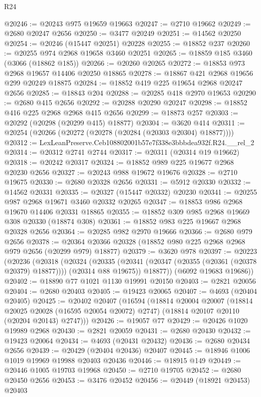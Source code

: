 \begin{lexlean}{R24}
\begin{coremodule}
@20246 := @20243 @975 @19659 @19663
@20247 := @2710 @19662
@20249 := @2680 @20247 @2656
@20250 := @3477 @20249
@20251 := @14562 @20250
@20254 := @20246 (@15447 @20251) @20228
@20255 := @18852 @237
@20260 := @20255 @974 @2968 @19658 @3460 @20251
@20265 := @18859 @185 @3460 (@3066 (@18862 @185))
@20266 := @20260 @20265
@20272 := @18853 @973 @2968 @19657 @14406 @20250 @18865
@20278 := @18867 @421 @2968 @19656 @299 @20249 @18875
@20284 := @18852 @419 @225 @19654 @2968 @20247 @2656
@20285 := @18843 @204
@20288 := @20285 @418 @2970 @19653
@20290 := @2680 @415 @2656
@20292 := @20288 @20290 @20247
@20298 := @18852 @416 @225 @2968 @2968 @415 @2656
@20299 := @18873 @257
@20303 := @20292 (@20298 (@20299 @415) @18877)
@20304 := @3620 @414
@20311 := @20254 (@20266 (@20272 (@20278 (@20284 (@20303 @20304) @18877))))
@20312 := LexLeanPreserve.Ceb108802001b57e7f338e3bbbdea932f.R24.__rel_2
@20314 := @20312 @2741 @2744
@20317 := @20311 (@20314 @19 @19662)
@20318 := @20242 @20317
@20324 := @18852 @989 @225 @19677 @2968 @20230 @2656
@20327 := @20243 @988 @19672 @19676
@20328 := @2710 @19675
@20330 := @2680 @20328 @2656
@20331 := @5912 @20330
@20332 := @14562 @20331
@20335 := @20327 (@15447 @20332) @20230
@20341 := @20255 @987 @2968 @19671 @3460 @20332 @20265
@20347 := @18853 @986 @2968 @19670 @14406 @20331 @18865
@20355 := @18852 @309 @985 @2968 @19669 @308 @20330 (@18874 @308)
@20361 := @18852 @983 @225 @19667 @2968 @20328 @2656
@20364 := @20285 @982 @2970 @19666
@20366 := @2680 @979 @2656
@20378 := @20364 @20366 @20328 (@18852 @980 @225 @2968 @2968 @979 @2656 (@20299 @979) @18877)
@20379 := @3620 @978
@20397 := @20223
    (@20236
      (@20318
        (@20324
          (@20335 (@20341 (@20347 (@20355 (@20361 (@20378 @20379) @18877)))) (@20314 @88 @19675))
          @18877))
      (@6092 @19683 @19686))
@20402 := @18890 @77 @1021 @1130 @19991 @20150
@20403 := @2821 @20056
@20404 := @2680 @20403
@20405 := @19423 @20065
@20407 := @4693 (@20404 @20405)
@20425 := @20402
    @20407
    (@16594
      (@18814
        @20004
        @20007
        (@18814 @20025 @20028 (@16595 @20054 @20072) @2747)
        (@18814 @20107 @20110 (@20204 @20143) @2747)))
@20426 := @19057 @77
@20429 := @20426 @1020 @19989 @2968
@20430 := @2821 @20059
@20431 := @2680 @20430
@20432 := @19423 @20064
@20434 := @4693 (@20431 @20432)
@20436 := @2680 @20434 @2656
@20439 := @20429 (@20404 @20436) @20407
@20445 := @18946 @1006 @1019 @19969 @19988 @20403 @20436
@20446 := @18915 @149
@20449 := @20446 @1005 @19703 @19968
@20450 := @2710 @19705
@20452 := @2680 @20450 @2656
@20453 := @3476 @20452
@20456 := @20449 (@18921 @20453) @20403

\end{coremodule}
\end{lexlean}
